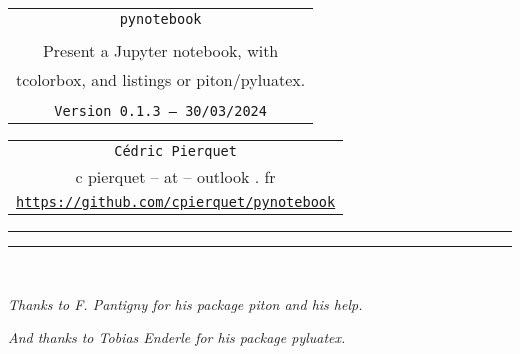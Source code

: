 \documentclass[english,11pt,a4paper]{article}
\def\TPversion{0.1.3}
\def\TPdate{30/03/2024}
\begin{document}
\pagestyle{fancy}

\thispagestyle{empty}

\begin{center}
	\begin{minipage}{0.88\linewidth}
	\begin{tcolorbox}[colframe=yellow,colback=yellow!15]
		\begin{center}
			\begin{tabular}{c}
				{\Huge \texttt{pynotebook}}\\
				\\
				{\LARGE Present a Jupyter notebook, with} \\
				{\LARGE tcolorbox, and listings or piton/pyluatex.} \\
				\\
				{\small \texttt{Version \TPversion{} -- \TPdate}}
		\end{tabular}
		\end{center}
	\end{tcolorbox}
\end{minipage}
\end{center}

\begin{center}
	\begin{tabular}{c}
	\texttt{Cédric Pierquet}\\
	{\ttfamily c pierquet -- at -- outlook . fr}\\
	\texttt{\url{https://github.com/cpierquet/pynotebook}}
\end{tabular}
\end{center}

\hrule


\hypertarget{matoc}{}

\tableofcontents

\vspace*{5mm}

\hrule

\vspace*{5mm}

\vfill~

\textit{\footnotesize Thanks to F. Pantigny for his package \textsf{piton} and his help.}

\textit{\footnotesize And thanks to Tobias Enderle for his package \textsf{pyluatex}.}

\pagebreak
\end{document}
